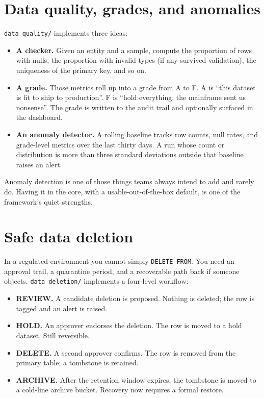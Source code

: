\documentclass[
  11pt,
  british,
  oneside]{book}
\providecommand{\tightlist}{%
  \setlength{\itemsep}{0pt}\setlength{\parskip}{0pt}}
\begin{document}
\hypertarget{data-quality-grades-and-anomalies}{%
\section{Data quality, grades, and
anomalies}\label{data-quality-grades-and-anomalies}}

\texttt{data\_quality/} implements three ideas:

\begin{itemize}
\tightlist
\item
  \textbf{A checker.} Given an entity and a sample, compute the
  proportion of rows with nulls, the proportion with invalid types (if
  any survived validation), the uniqueness of the primary key, and so
  on.
\item
  \textbf{A grade.} Those metrics roll up into a grade from A to F. A is
  ``this dataset is fit to ship to production''. F is ``hold everything,
  the mainframe sent us nonsense''. The grade is written to the audit
  trail and optionally surfaced in the dashboard.
\item
  \textbf{An anomaly detector.} A rolling baseline tracks row counts,
  null rates, and grade-level metrics over the last thirty days. A run
  whose count or distribution is more than three standard deviations
  outside that baseline raises an alert.
\end{itemize}

Anomaly detection is one of those things teams always intend to add and
rarely do. Having it in the core, with a usable-out-of-the-box default,
is one of the framework's quiet strengths.

\hypertarget{safe-data-deletion}{%
\section{Safe data deletion}\label{safe-data-deletion}}

In a regulated environment you cannot simply \texttt{DELETE\ FROM}. You
need an approval trail, a quarantine period, and a recoverable path back
if someone objects. \texttt{data\_deletion/} implements a four-level
workflow:

\begin{itemize}
\tightlist
\item
  \textbf{REVIEW.} A candidate deletion is proposed. Nothing is deleted;
  the row is tagged and an alert is raised.
\item
  \textbf{HOLD.} An approver endorses the deletion. The row is moved to
  a hold dataset. Still reversible.
\item
  \textbf{DELETE.} A second approver confirms. The row is removed from
  the primary table; a tombstone is retained.
\item
  \textbf{ARCHIVE.} After the retention window expires, the tombstone is
  moved to a cold-line archive bucket. Recovery now requires a formal
  restore.
\end{itemize}
\end{document}
